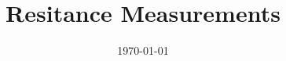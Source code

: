 \documentclass[a4paper]{article}
\title{Resitance Measurements}
\date{\today}
\begin{document}
\maketitle

\Blinddocument

\layout
\end{document}
